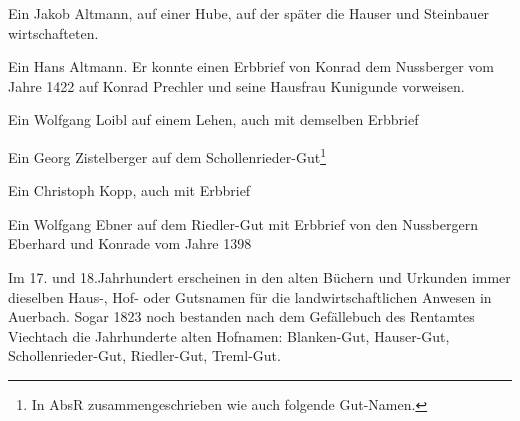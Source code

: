 \documentclass{book}
\begin{document}
\begin{compactitem}
\item Ein Jakob Altmann, auf einer Hube, auf der später die Hauser und
Steinbauer wirtschafteten.

\item Ein Hans Altmann. Er konnte einen Erbbrief von Konrad dem
Nussberger vom Jahre 1422 auf Konrad Prechler und seine Hausfrau
Kunigunde vorweisen.

\item Ein Wolfgang Loibl auf einem Lehen, auch mit demselben Erbbrief

\item Ein Georg Zistelberger auf dem Schollenrieder-Gut\footnote{In AbsR
zusammengeschrieben wie auch folgende Gut-Namen.}
\item Ein Christoph Kopp, auch mit Erbbrief

\item Ein Wolfgang Ebner auf dem Riedler-Gut mit Erbbrief von den
Nussbergern Eberhard und Konrade vom Jahre 1398
\end{compactitem}

Im 17. und 18.Jahrhundert erscheinen in den alten Büchern und Urkunden
immer dieselben Haus-, Hof- oder Gutsnamen für die landwirtschaftlichen
Anwesen in Auerbach. Sogar 1823 noch bestanden nach dem Gefällebuch des
Rentamtes Viechtach die Jahrhunderte alten Hofnamen: Blanken-Gut,
Hauser-Gut, Schollenrieder-Gut, Riedler-Gut, Treml-Gut.
\end{document}
